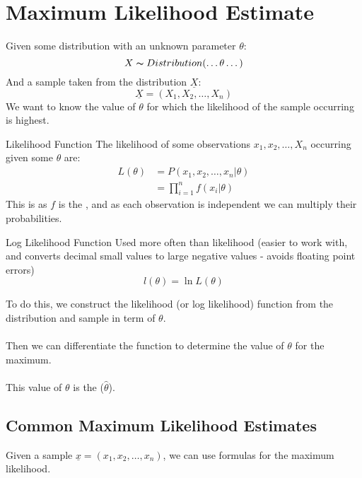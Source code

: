 \chapter{Maximum Likelihood Estimate}

Given some distribution with an unknown parameter $\theta$:
\[X \thicksim Distribution(\dots \theta \dots)\]
And a sample taken from the distribution $\underline{X}$:
\[\underline{X} = (X_1, X_2, \dots, X_n)\]
We want to know the value of $\theta$ for which the likelihood of the sample occurring is highest.
\begin{definitionbox}{Likelihood Function}
	The likelihood of some observations $x_1, x_2, \dots, X_n$ occurring given some $\theta$ are:
	\[\begin{split}
			L(\theta) &= P(x_1, x_2, \dots, x_n|\theta) \\
			&= \prod_{i=1}^n f(x_i|\theta)
		\end{split}\]
	This is as $f$ is the , and as each observation is independent we can multiply their probabilities.
\end{definitionbox}
\begin{definitionbox}{Log Likelihood Function}
	Used more often than likelihood (easier to work with, and converts decimal small values to large negative values - avoids floating point errors)
	\[l(\theta) = \ln L(\theta)\]
\end{definitionbox}
To do this, we construct the likelihood (or log likelihood) function from the distribution and sample in term of $\theta$.
\\
\\ Then we can differentiate the function to determine the value of $\theta$ for the maximum.
\\
\\ This value of $\theta$ is the  ($\hat{\theta}$).

\section{Common Maximum Likelihood Estimates}
Given a sample $\underline{x} = (x_1, x_2, \dots, x_n)$, we can use formulas for the maximum likelihood.

